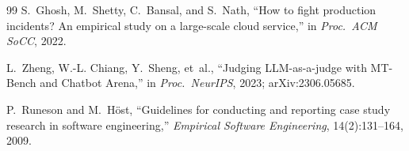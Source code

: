 \documentclass[conference]{IEEEtran}
\begin{document}
\begin{thebibliography}{99}
S.~Ghosh, M.~Shetty, C.~Bansal, and S.~Nath, ``How to fight production incidents?
An empirical study on a large-scale cloud service,'' in \emph{Proc.\ ACM SoCC}, 2022.

L.~Zheng, W.-L. Chiang, Y.~Sheng, et~al., ``Judging LLM-as-a-judge with MT-Bench
and Chatbot Arena,'' in \emph{Proc.\ NeurIPS}, 2023; arXiv:2306.05685.

P.~Runeson and M.~H\"ost, ``Guidelines for conducting and reporting case study
research in software engineering,'' \emph{Empirical Software Engineering}, 14(2):131--164, 2009.
\end{thebibliography}
\end{document}
